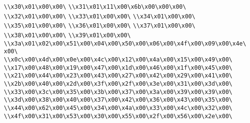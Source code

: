 \verb|\\x30\x01\x00\x00\|\newline
\verb|\\x31\x01\x11\x00\x6b\x00\x00\x00\|\newline
\verb|\\x32\x01\x00\x00\|\newline
\verb|\\x33\x01\x00\x00\|\newline
\verb|\\x34\x01\x00\x00\|\newline
\verb|\\x35\x01\x00\x00\|\newline
\verb|\\x36\x01\x00\x00\|\newline
\verb|\\x37\x01\x00\x00\|\newline
\verb|\\x38\x01\x00\x00\|\newline
\verb|\\x39\x01\x00\x00\|\newline
\verb|\\x3a\x01\x02\x00\x51\x00\x04\x00\x50\x00\x06\x00\x4f\x00\x09\x00\x4e\x00\|\newline
\verb|\\x0c\x00\x4d\x00\x0e\x00\x4c\x00\x12\x00\x4a\x00\x15\x00\x49\x00\|\newline
\verb|\\x17\x00\x48\x00\x19\x00\x47\x00\x1d\x00\x46\x00\x1f\x00\x45\x00\|\newline
\verb|\\x21\x00\x44\x00\x23\x00\x43\x00\x27\x00\x42\x00\x29\x00\x41\x00\|\newline
\verb|\\x2b\x00\x40\x00\x2d\x00\x3f\x00\x2f\x00\x3e\x00\x31\x00\x3d\x00\|\newline
\verb|\\x33\x00\x3c\x00\x35\x00\x3b\x00\x37\x00\x3a\x00\x39\x00\x39\x00\|\newline
\verb|\\x3d\x00\x38\x00\x40\x00\x37\x00\x42\x00\x36\x00\x43\x00\x35\x00\|\newline
\verb|\\x44\x00\x62\x00\x45\x00\x34\x00\x4a\x00\x33\x00\x4c\x00\x32\x00\|\newline
\verb|\\x4f\x00\x31\x00\x53\x00\x30\x00\x55\x00\x2f\x00\x56\x00\x2e\x00\|\newline
